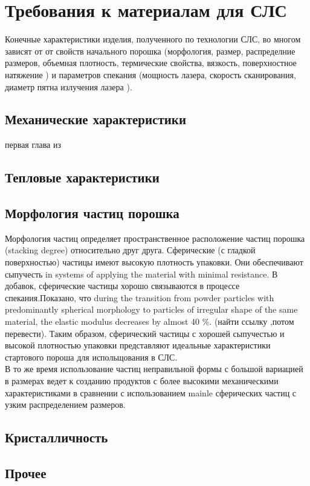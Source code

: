 \section{Требования к материалам для СЛС}

Конечные характеристики изделия, полученного по технологии СЛС, во многом зависят от от свойств начального порошка (морфология, размер, распределние размеров, объемная плотность, термические свойства, вязкость, поверхностное натяжение )  и параметров спекания (мощность лазера, скорость сканирования, диаметр пятна излучения лазера ).

\subsection{Механические характеристики}
первая глава из
\cite{termopols}
\subsection{Тепловые характеристики}
\subsection{Морфология частиц порошка}
Морфология частиц определяет пространственное расположение частиц порошка (stacking degree) относительно друг друга. Сферические (с гладкой поверхностью) частицы имеют высокую плотность упаковки. Они обеспечивают  сыпучесть in systems of applying the material with minimal resistance. В добавок, сферические частицы хорошо связываются в процессе спекания.Показано, что 
during the transition from powder particles with predominantly spherical morphology to particles of irregular shape of the same material, the elastic modulus decreases by almost 40 \%. 
(найти ссылку ,потом перевести).
Таким образом, сферический частицы с хорошей сыпучестью и высокой плотностью упаковки представляют идеальные характеристики стартового пороша для испольщования в СЛС.\\
В то же время использование частиц неправильной формы с большой вариацией в размерах ведет к созданию продуктов с более высокими механическими характеристиками в сравнении с использованием mainle сферических частиц с узким распределением размеров.

\subsection{Кристалличность}

\subsection{Прочее}


